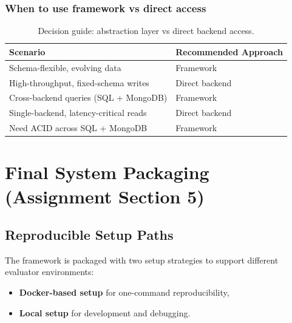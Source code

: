 \documentclass[12pt,a4paper]{article}
\begin{document}
\subsubsection*{When to use framework vs direct access}
\begin{table}[H]
\centering
\begin{tabular}{l l}
\toprule
\textbf{Scenario} & \textbf{Recommended Approach} \\
\midrule
Schema-flexible, evolving data & Framework \\
High-throughput, fixed-schema writes & Direct backend \\
Cross-backend queries (SQL + MongoDB) & Framework \\
Single-backend, latency-critical reads & Direct backend \\
Need ACID across SQL + MongoDB & Framework \\
\bottomrule
\end{tabular}
\caption{Decision guide: abstraction layer vs direct backend access.}
\end{table}


\section{Final System Packaging (Assignment Section 5)}

\subsection{Reproducible Setup Paths}
The framework is packaged with two setup strategies to support different evaluator environments:
\begin{itemize}
	\item \textbf{Docker-based setup} for one-command reproducibility,
	\item \textbf{Local setup} for development and debugging.
\end{itemize}
\end{document}
